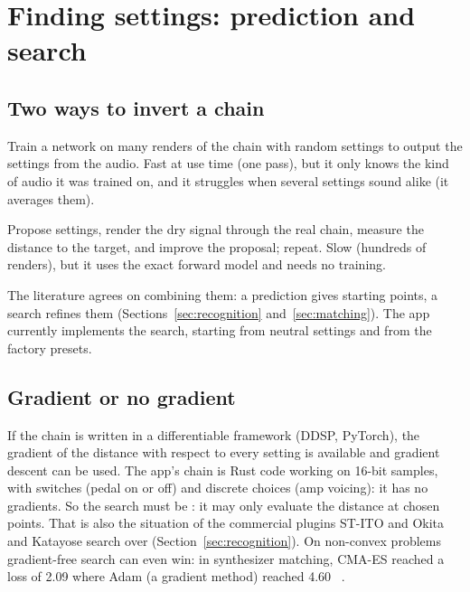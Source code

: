 \section{Finding settings: prediction and search}
\label{sec:search}

\subsection{Two ways to invert a chain}

\begin{description}[style=nextline,leftmargin=1.2cm]
\item[Prediction] Train a network on many renders of the chain with random
  settings to output the settings from the audio. Fast at use time (one pass),
  but it only knows the kind of audio it was trained on, and it struggles when
  several settings sound alike (it averages them).
\item[Analysis by synthesis (search)] Propose settings, render the dry signal
  through the real chain, measure the distance to the target, and improve the
  proposal; repeat. Slow (hundreds of renders), but it uses the exact forward
  model and needs no training.
\end{description}
The literature agrees on combining them: a prediction gives starting points, a
search refines them (Sections~\ref{sec:recognition} and~\ref{sec:matching}).
The app currently implements the search, starting from neutral settings and
from the factory presets.

\subsection{Gradient or no gradient}

If the chain is written in a differentiable framework (DDSP, PyTorch), the
gradient of the distance with respect to every setting is available and
gradient descent can be used. The app's chain is Rust code working on 16-bit
samples, with switches (pedal on or off) and discrete choices (amp voicing): it
has no gradients. So the search must be : it may only
evaluate the distance at chosen points. That is also the situation of the
commercial plugins ST-ITO and Okita and Katayose search over
(Section~\ref{sec:recognition}). On non-convex problems gradient-free search can
even win: in synthesizer matching, CMA-ES reached a loss of 2.09 where Adam
(a gradient method) reached 4.60 \reported~\cite{bogdan2026instrumental}.

